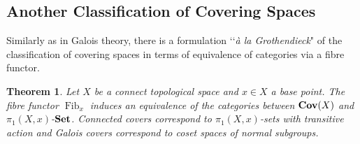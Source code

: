 \documentclass{article}
\theoremstyle{plain}
\newtheorem{theorem}{Theorem}[subsection]
\theoremstyle{definition}
\DeclareMathOperator{\Fib}{Fib}
\DeclareMathOperator{\SET}{\bf{Set}}
\DeclareMathOperator{\Cov}{\bf{Cov}}
\begin{document}
\subsection{Another Classification of Covering Spaces}
\label{equivalence_fibre_functor}


\noindent Similarly as in Galois theory, there is a formulation ‘‘\textit{\`a la Grothendieck}" of the classification of covering spaces in terms of equivalence of categories via a fibre functor.



\begin{theorem}
\label{covering_reformulation_1}
    Let $X$ be a connect topological space and $x\in X$ a base point. The fibre functor $\Fib_x$ induces an equivalence of the categories between $\Cov(X)$ and $\pi_1(X,x)$-$\SET$.
    Connected covers correspond to $\pi_1(X,x)$-sets with transitive action 
    and Galois covers correspond to coset spaces of normal subgroups.
\end{theorem}
\end{document}
